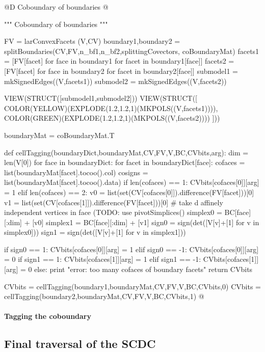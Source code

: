 \documentclass[11pt,oneside]{article}	%
\begin{document}
@D Coboundary of boundaries
@{""" Coboundary of boundaries """

FV = larConvexFacets (V,CV)
boundary1,boundary2 = splitBoundaries(CV,FV,n_bf1,n_bf2,splittingCovectors,
										coBoundaryMat)
facets1 = [FV[facet] for face in boundary1 for facet in boundary1[face]]
facets2 = [FV[facet] for face in boundary2 for facet in boundary2[face]]
submodel1 = mkSignedEdges((V,facets1))
submodel2 = mkSignedEdges((V,facets2))

VIEW(STRUCT([submodel1,submodel2]))
VIEW(STRUCT([ COLOR(YELLOW)(EXPLODE(1.2,1.2,1)(MKPOLS((V,facets1)))), 
		COLOR(GREEN)(EXPLODE(1.2,1.2,1)(MKPOLS((V,facets2)))) ]))
		
boundaryMat = coBoundaryMat.T

def cellTagging(boundaryDict,boundaryMat,CV,FV,V,BC,CVbits,arg):
	dim = len(V[0])
	for face in boundaryDict:
		for facet in boundaryDict[face]:
			cofaces = list(boundaryMat[facet].tocoo().col)
			cosigns = list(boundaryMat[facet].tocoo().data)
			if len(cofaces) == 1: 
				CVbits[cofaces[0]][arg] = 1
			elif len(cofaces) == 2:
				v0 = list(set(CV[cofaces[0]]).difference(FV[facet]))[0]
				v1 = list(set(CV[cofaces[1]]).difference(FV[facet]))[0]
				# take d affinely independent vertices in face (TODO: use pivotSimplices() 
				simplex0 = BC[face][:dim] + [v0]
				simplex1 = BC[face][:dim] + [v1]
				sign0 = sign(det([V[v]+[1] for v in simplex0]))
				sign1 = sign(det([V[v]+[1] for v in simplex1]))
				
				if sign0 == 1: CVbits[cofaces[0]][arg] = 1
				elif sign0 == -1: CVbits[cofaces[0]][arg] = 0
				if sign1 == 1: CVbits[cofaces[1]][arg] = 1
				elif sign1 == -1: CVbits[cofaces[1]][arg] = 0
			else: 
				print "error: too many cofaces of boundary facets"
	return CVbits
	
CVbits = cellTagging(boundary1,boundaryMat,CV,FV,V,BC,CVbits,0)
CVbits = cellTagging(boundary2,boundaryMat,CV,FV,V,BC,CVbits,1)
@}




\paragraph{Tagging the coboundary}


\subsection{Final traversal of the SCDC}
\label{sec:traversal}
\end{document}
